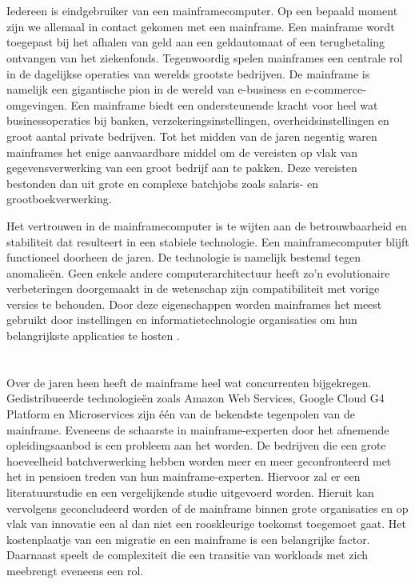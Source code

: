 \section{}

Iedereen is eindgebruiker van een mainframecomputer. Op een bepaald moment zijn we allemaal in contact gekomen met een mainframe. Een mainframe wordt toegepast bij het afhalen van geld aan een geldautomaat of een terugbetaling ontvangen van het ziekenfonds. Tegenwoordig spelen mainframes een centrale rol in de dagelijkse operaties van werelds grootste bedrijven. De mainframe is namelijk een gigantische pion in de wereld van e-business en e-commerce-omgevingen. Een mainframe biedt een ondersteunende kracht voor heel wat businessoperaties bij banken, verzekeringsinstellingen, overheidsinstellingen en groot aantal private bedrijven. Tot het midden van de jaren negentig waren mainframes het enige aanvaardbare middel om de vereisten op vlak van gegevensverwerking van een groot bedrijf aan te pakken. Deze vereisten bestonden dan uit grote en complexe batchjobs zoals salaris- en grootboekverwerking.

Het vertrouwen in de mainframecomputer is te wijten aan de betrouwbaarheid en stabiliteit dat resulteert in een stabiele technologie. Een mainframecomputer blijft functioneel doorheen de jaren. De technologie is namelijk bestemd tegen anomalieën. Geen enkele andere computerarchitectuur heeft zo'n evolutionaire verbeteringen doorgemaakt in de wetenschap zijn compatibiliteit met vorige versies te behouden. Door deze eigenschappen worden mainframes het meest gebruikt door instellingen en informatietechnologie organisaties om hun belangrijkste applicaties te hosten \autocite{Ebbers2022}. 


\section{}
\label{sec:probleemstelling}

Over de jaren heen heeft de mainframe heel wat concurrenten bijgekregen. Gedistribueerde technologieën zoals Amazon Web Services, Google Cloud G4 Platform en Microservices zijn één van de bekendste tegenpolen van de mainframe. Eveneens de schaarste in mainframe-experten door het afnemende opleidingsaanbod is een probleem aan het worden. De bedrijven die een grote hoeveelheid batchverwerking hebben worden meer en meer geconfronteerd met het in pensioen treden van hun mainframe-experten. Hiervoor zal er een literatuurstudie en een vergelijkende studie uitgevoerd worden. Hieruit kan vervolgens geconcludeerd worden of de mainframe binnen grote organisaties en op vlak van innovatie een al dan niet een rooskleurige toekomst toegemoet gaat. Het kostenplaatje van een migratie en een mainframe is een belangrijke factor. Daarnaast speelt de complexiteit die een transitie van workloads met zich meebrengt eveneens een rol. 


